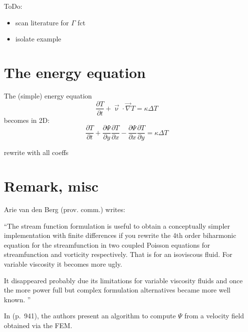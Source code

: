 \vspace{0.5cm}

{\color{orange} 
ToDo: 
\begin{itemize}
\item scan literature for $\Gamma$ fct
\item isolate example
\end{itemize}
}



\section{The energy equation}

The (simple) energy equation
\[
\frac{\partial T}{\partial t} + \vec\upnu \cdot \vec\nabla T = \kappa \Delta T
\]
becomes in 2D:
\[
\frac{\partial T}{\partial t} + 
\frac{\partial \Psi}{\partial y}\frac{\partial T}{\partial x} 
-\frac{\partial \Psi}{\partial x}\frac{\partial T}{\partial y} 
= \kappa \Delta T
\]

{\color{teal} rewrite with all coeffs}


\section{Remark, misc}

Arie van den Berg (prov. comm.) writes:
\begin{displayquote}
{\color{darkgray}
``The stream function formulation is useful to obtain a conceptually
simpler implementation with finite differences if you rewrite the 4th
order biharmonic equation for the streamfunction in two coupled Poisson
equations for streamfunction and vorticity respectively. That is for an
isoviscous fluid. For variable viscosity it becomes more ugly.

It disappeared probably due its limitations for variable viscosity fluids
and once the more power full  but complex formulation alternatives
became more well known. ''
}
\end{displayquote}

In \textcite{grsa} (p.~941), the authors present an algorithm to compute $\Psi$
from a velocity field obtained via the FEM. 


















